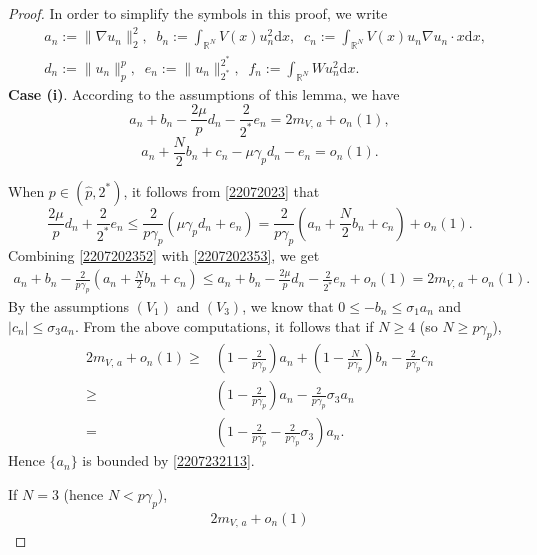 \documentclass[10pt]{article}
\numberwithin{equation}{section}
\newcommand{\ud}{\mathrm{d}}
\numberwithin{equation}{section}
\begin{document}
\begin{proof}
In order to simplify the symbols in this proof, we write
\[
\begin{aligned}
&a_n:=\|\nabla u_n\|_2^2,\;\; b_n:=\int_{\mathbb{R}^N}V(x)u^2_n \ud x,\;\; c_n:=\int_{\mathbb{R}^N}V(x)u_n\nabla u_n\cdot x \ud x,\\
&d_n:=\|u_n\|_p^p,\;\; e_n:=\|u_n\|_{2^*}^{2^*},\;\; f_n:=\int_{\mathbb{R}^N}Wu_n^2 \ud x.
\end{aligned}
\]
{\bf Case (i)}. According to the assumptions of this lemma, we have
\begin{equation}\label{2207202352}
    a_n+b_n-\frac{2\mu}{p}d_n-\frac{2}{2^*}e_n=2{m}_{V,\, a}+o_n(1),
\end{equation}
\begin{equation}\label{22072023}
a_n+\frac{N}{2}b_n+c_n-\mu\gamma_p d_n -e_n=o_n(1).
\end{equation}\par
When $p\in (\hat{p}, 2^*)$, it follows from \eqref{22072023} that
\begin{equation}\label{2207202353}
\frac{2\mu}{p}d_n+\frac{2}{2^*}e_n\le \frac{2}{p\gamma_p}\left(\mu\gamma_p d_n+e_n\right)=\frac{2}{p\gamma_p}\left(a_n+\frac{N}{2}b_n+c_n \right)+o_n(1).
\end{equation}
Combining \eqref{2207202352} with \eqref{2207202353}, we get
\[
\begin{aligned}
a_n+b_n-\frac{2}{p\gamma_p}\left(a_n+\frac{N}{2}b_n+c_n \right)
\le a_n+b_n-\frac{2\mu}{p}d_n-\frac{2}{2^*}e_n+o_n(1)
= 2{m}_{V,\, a}+o_n(1).
\end{aligned}
\]
By the assumptions $(V_1)$ and $(V_3)$, we know that  $0\le-b_n\le \sigma_1 a_n$ and $|c_n|\le {\sigma_3} a_n$. From the above computations, it follows that if $N\ge 4$ (so $N\ge p\gamma_p$),
\[
\begin{aligned}
2{m}_{V,\, a}+o_n(1)\ge& (1-\frac{2}{p\gamma_p})a_n+(1-\frac{N}{p\gamma_p})b_n-\frac{2}{p\gamma_p}c_n
\\
\ge &(1-\frac{2}{p\gamma_p})a_n-\frac{2}{p\gamma_p} {\sigma_3} a_n\\
=&\left(1-\frac{2}{p\gamma_p}-\frac{2}{p\gamma_p} {\sigma_3}\right)a_n.
\end{aligned}
\]
Hence $\{a_n\}$ is bounded by \eqref{2207232113}. \par
If $N=3$ (hence $N< p\gamma_p$),
\[
\begin{aligned}
2{m}_{V,\, a}+o_n(1)

\end{aligned}\]
\end{proof}
\end{document}
